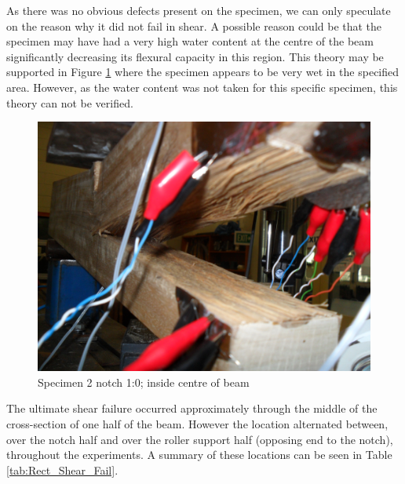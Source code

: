 \documentclass[11pt,a4paper]{article}
\numberwithin{equation}{subsection}
\begin{document}
\noindent
As there was no obvious defects present on the specimen, we can only speculate on the reason why it did not fail in shear. A possible reason could be that the specimen may have had a very high water content at the centre of the beam significantly decreasing its flexural capacity in this region. This theory may be supported in Figure \ref{fig:Spec_2_wet} where the specimen appears to be very wet in the specified area. However, as the water content was not taken for this specific specimen, this theory can not be verified. 

\begin{figure}[h]
	\begin{center}
		\includegraphics[scale=0.1]{Spec_2_wet}
	\end{center}
	\caption{Specimen 2 notch 1:0; inside centre of beam}
	\label{fig:Spec_2_wet}
\end{figure}

\noindent
The ultimate shear failure occurred approximately through the middle of the cross-section of one half of the beam. However the location alternated between, over the notch half and over the roller support half (opposing end to the notch), throughout the experiments. A summary of these locations can be seen in Table \ref{tab:Rect_Shear_Fail}.

\vspace*{\baselineskip}
\end{document}
